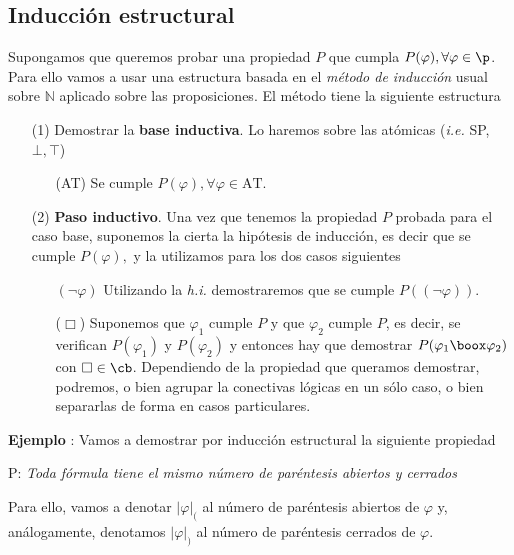 \subsection*{Inducción estructural}
Supongamos que queremos probar una propiedad $P$ que cumpla $P(\varphi), \forall \varphi \in \p$. Para ello vamos a usar una estructura basada en el \textit{método de inducción} usual sobre $\mathbb{N}$ aplicado sobre las proposiciones. El método tiene la siguiente estructura 
\begin{itemize}
	\item[(1)] Demostrar la \textbf{base inductiva}. Lo haremos sobre las atómicas (\textit{i.e.} SP, $\bot, \top$)
	\begin{itemize}
		\item[(AT)] Se cumple $P(\varphi), \forall \varphi \in \mbox{AT}$.
	\end{itemize}
	\item[(2)] \textbf{Paso inductivo}. Una vez que tenemos la propiedad $P$ probada para el caso base, suponemos la cierta la hipótesis de inducción, es decir que se cumple $P(\varphi),$ y la utilizamos para los dos casos siguientes
	\begin{itemize}
		\item[$(\lnot \varphi)$] Utilizando la \textit{h.i.} demostraremos que se cumple $P((\lnot \varphi))$.
		\item[($\Box$)] Suponemos que $\varphi_1$ cumple $P$ y que $\varphi_2$ cumple $P$, es decir, se verifican $P(\varphi_1)$ y $P(\varphi_2)$ y entonces hay que demostrar $P(\varphi_1 \boox \varphi_2)$ con $\Box \in \cb$. Dependiendo de la propiedad que queramos demostrar, podremos, o bien agrupar la conectivas lógicas en un sólo caso, o bien separarlas de forma en casos particulares. 
	\end{itemize}
\end{itemize} 
\addtocounter{ej}{1} %
\textbf{Ejemplo }: Vamos a demostrar por inducción estructural la siguiente propiedad
\begin{center}
P: \textit{Toda fórmula tiene el mismo número de paréntesis abiertos y cerrados}
\end{center}
Para ello, vamos a denotar $\vert \varphi \vert_{(}$ al número de paréntesis abiertos de $\varphi$ y, análogamente, denotamos $\vert \varphi \vert_{)}$ al número de paréntesis cerrados de $\varphi$.
